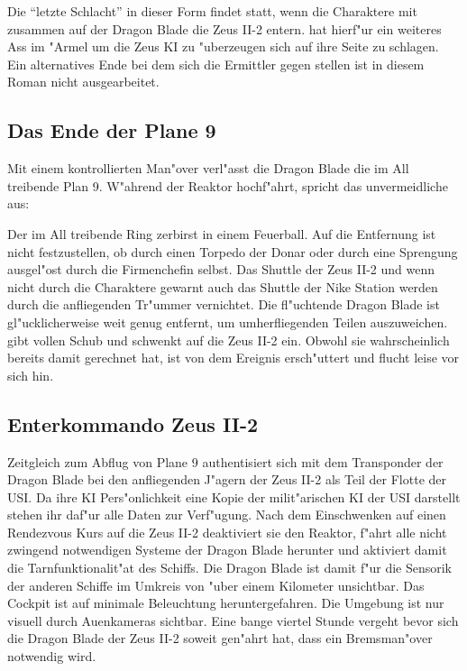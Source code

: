 
Die "`letzte Schlacht"' in dieser Form findet statt, wenn die Charaktere mit \xl{} zusammen auf der Dragon Blade die Zeus II-2 entern. \xl{} hat hierf"ur ein weiteres Ass im "Armel um die Zeus KI zu "uberzeugen sich auf ihre Seite zu schlagen. Ein alternatives Ende bei dem sich die Ermittler gegen \xl{} stellen ist in diesem Roman nicht ausgearbeitet.

\subsection{Das Ende der Plane 9}
Mit einem kontrollierten Man"over verl"asst die Dragon Blade die im All treibende Plan 9. W"ahrend der Reaktor hochf"ahrt, spricht \xl{} das unvermeidliche aus:


Der im All treibende Ring zerbirst in einem Feuerball. Auf die Entfernung ist nicht festzustellen, ob durch einen Torpedo der Donar oder durch eine Sprengung ausgel"ost durch die Firmenchefin selbst. Das Shuttle der Zeus II-2 und wenn nicht durch die Charaktere gewarnt auch das Shuttle der Nike Station werden durch die anfliegenden Tr"ummer vernichtet. Die fl"uchtende Dragon Blade ist gl"ucklicherweise weit genug entfernt, um umherfliegenden Teilen auszuweichen. \xl{} gibt vollen Schub und schwenkt auf die Zeus II-2 ein. Obwohl sie wahrscheinlich bereits damit gerechnet hat, ist \ml{} von dem Ereignis ersch"uttert und flucht leise vor sich hin.

\subsection{Enterkommando Zeus II-2}
Zeitgleich zum Abflug von Plane 9 authentisiert sich \xl{} mit dem Transponder der Dragon Blade bei den anfliegenden J"agern der Zeus II-2 als Teil der Flotte der USI. Da ihre KI Pers"onlichkeit eine Kopie der milit"arischen KI der USI darstellt stehen ihr daf"ur alle Daten zur Verf"ugung. Nach dem Einschwenken auf einen Rendezvous Kurs auf die Zeus II-2 deaktiviert sie den Reaktor, f"ahrt alle nicht zwingend notwendigen Systeme der Dragon Blade herunter und aktiviert damit die Tarnfunktionalit"at des Schiffs. Die Dragon Blade ist damit f"ur die Sensorik der anderen Schiffe im Umkreis von "uber einem Kilometer unsichtbar. Das Cockpit ist auf minimale Beleuchtung heruntergefahren. Die Umgebung ist nur visuell durch Au\3enkameras sichtbar. Eine bange viertel Stunde vergeht bevor sich die Dragon Blade der Zeus II-2 soweit gen"ahrt hat, dass ein Bremsman"over notwendig wird.

